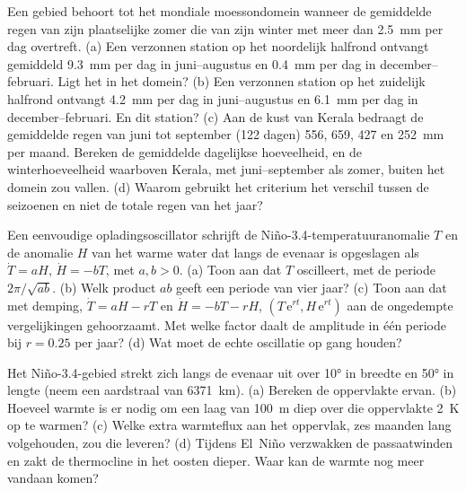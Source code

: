 \begin{exercise}[$\star\star$]\label{exo:b2:climate-variability:9}
Een gebied behoort tot het mondiale moessondomein wanneer de gemiddelde regen van zijn plaatselijke zomer die
van zijn winter met meer dan \qty{2.5}{mm} per dag overtreft. (a) Een verzonnen station op het noordelijk
halfrond ontvangt gemiddeld \qty{9.3}{mm} per dag in juni--augustus en \qty{0.4}{mm} per dag in
december--februari. Ligt het in het domein? (b) Een verzonnen station op het zuidelijk halfrond
ontvangt \qty{4.2}{mm} per dag in juni--augustus en \qty{6.1}{mm} per dag in december--februari. En
dit station? (c) Aan de kust van Kerala bedraagt de gemiddelde regen van juni tot september (122 dagen) 556, 659, 427 en
\qty{252}{mm} per maand. Bereken de gemiddelde dagelijkse hoeveelheid, en de winterhoeveelheid waarboven Kerala,
met juni--september als zomer, buiten het domein zou vallen. (d) Waarom gebruikt het criterium
het verschil tussen de seizoenen en niet de totale regen van het jaar?
\end{exercise}

\begin{exercise}[$\star\star\star$]\label{exo:b2:climate-variability:10}
Een eenvoudige opladingsoscillator schrijft de Niño-3.4-temperatuuranomalie $T$ en de anomalie $H$ van het
warme water dat langs de evenaar is opgeslagen als $\dot T = aH$, $\dot H = -bT$, met $a, b > 0$. (a) Toon aan
dat $T$ oscilleert, met de periode $2\pi/\sqrt{ab}$. (b) Welk product $ab$ geeft een periode van
vier jaar? (c) Toon aan dat met demping, $\dot T = aH - rT$ en $\dot H = -bT - rH$,
$(T\,\mathrm{e}^{rt}, H\,\mathrm{e}^{rt})$ aan de ongedempte vergelijkingen gehoorzaamt. Met welke factor daalt de amplitude
in één periode bij $r = 0.25$ per
jaar? (d) Wat moet de echte oscillatie op gang houden?
\end{exercise}

\begin{exercise}[$\star\star\star$]\label{exo:b2:climate-variability:11}
Het Niño-3.4-gebied strekt zich langs de evenaar uit over \ang{10} in breedte en \ang{50} in lengte
(neem een aardstraal van \qty{6371}{km}). (a) Bereken de oppervlakte ervan. (b) Hoeveel warmte is er nodig om
een laag van \qty{100}{m} diep over die oppervlakte \qty{2}{K} op te warmen? (c) Welke extra warmteflux aan het oppervlak,
zes maanden lang volgehouden, zou die leveren? (d) Tijdens El~Niño verzwakken de passaatwinden en zakt de
thermocline in het oosten dieper. Waar kan de warmte nog meer vandaan komen?
\end{exercise}

